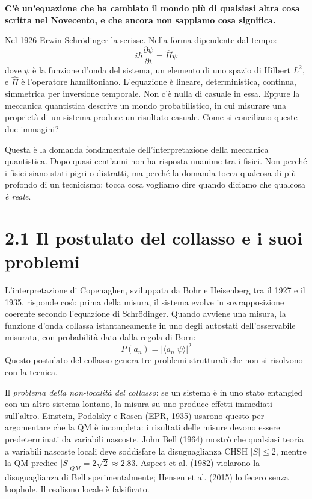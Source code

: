 \documentclass[11.5pt,a4paper,openany]{book}
\theoremstyle{remark}
\begin{document}
\textbf{C'è un'equazione che ha cambiato il mondo più di qualsiasi altra cosa scritta nel Novecento, e che ancora non sappiamo cosa significa.}

Nel 1926 Erwin Schrödinger la scrisse. Nella forma dipendente dal tempo:
\[
i\hbar \frac{\partial\psi}{\partial t} = \hat{H}\psi
\]
dove $\psi$ è la funzione d'onda del sistema, un elemento di uno spazio di Hilbert $L^2$, e $\hat{H}$ è l'operatore hamiltoniano. L'equazione è lineare, deterministica, continua, simmetrica per inversione temporale. Non c'è nulla di casuale in essa. Eppure la meccanica quantistica descrive un mondo probabilistico, in cui misurare una proprietà di un sistema produce un risultato casuale. Come si conciliano queste due immagini?

Questa è la domanda fondamentale dell'interpretazione della meccanica quantistica. Dopo quasi cent'anni non ha risposta unanime tra i fisici. Non perché i fisici siano stati pigri o distratti, ma perché la domanda tocca qualcosa di più profondo di un tecnicismo: tocca cosa vogliamo dire quando diciamo che qualcosa \textit{è reale}.

\section{2.1 Il postulato del collasso e i suoi problemi}

L'interpretazione di Copenaghen, sviluppata da Bohr e Heisenberg tra il 1927 e il 1935, risponde così: prima della misura, il sistema evolve in sovrapposizione coerente secondo l'equazione di Schrödinger. Quando avviene una misura, la funzione d'onda collassa istantaneamente in uno degli autostati dell'osservabile misurata, con probabilità data dalla regola di Born:
\[
P(a_n) = |\langle a_n|\psi\rangle|^2
\]
Questo postulato del collasso genera tre problemi strutturali che non si risolvono con la tecnica.

Il \textit{problema della non-località del collasso}: se un sistema è in uno stato entangled con un altro sistema lontano, la misura su uno produce effetti immediati sull'altro. Einstein, Podolsky e Rosen (EPR, 1935) usarono questo per argomentare che la QM è incompleta: i risultati delle misure devono essere predeterminati da variabili nascoste. John Bell (1964) mostrò che qualsiasi teoria a variabili nascoste locali deve soddisfare la disuguaglianza CHSH $|S| \leq 2$, mentre la QM predice $|S|_{QM} = 2\sqrt{2} \approx 2.83$. Aspect et al. (1982) violarono la disuguaglianza di Bell sperimentalmente; Hensen et al. (2015) lo fecero senza loophole. Il realismo locale è falsificato.
\end{document}

